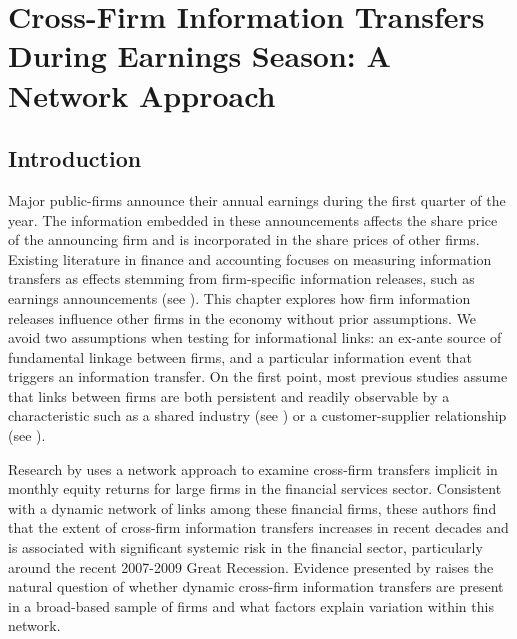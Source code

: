 \chapter{Cross-Firm Information Transfers During Earnings Season: A Network Approach} \label{Chapter:EATE}


\section{Introduction}


Major public-firms announce their annual earnings during the first quarter of the year.  The information embedded in these announcements affects the share price of the announcing firm and is incorporated in the share prices of other firms.  Existing literature in finance and accounting focuses on measuring information transfers as effects stemming from firm-specific information releases, such as earnings announcements (see \cite{Foster1981}). This chapter explores how firm information releases influence other firms in the economy without prior assumptions.   We avoid two  assumptions when testing for informational links: an ex-ante source of fundamental linkage between firms, and a particular information event that triggers an information transfer.  On the first point, most previous studies assume that links between firms are both persistent and readily observable by a characteristic such as a shared industry (see \cite{Foster1981}) or a customer-supplier relationship (see \cite{OlsenDietrich1985,  AhernHarford2014}). 

Research by \cite{Billio2012} uses a network approach to examine cross-firm transfers implicit in monthly equity returns for large firms in the financial services sector.  Consistent with a dynamic network of links among these financial firms, these authors find that the extent of cross-firm information transfers increases in recent decades and is associated with significant systemic risk in the financial sector, particularly around the recent 2007-2009 Great Recession.  Evidence presented by \cite{Billio2012} raises the natural question of whether dynamic cross-firm information transfers are present in a broad-based sample of firms and what factors explain variation within this network.

